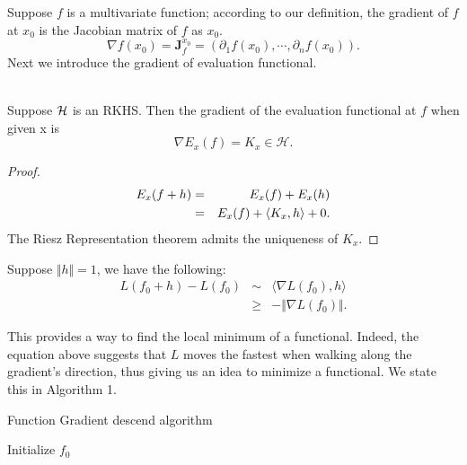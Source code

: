 %	
Suppose $f$ is a multivariate function; according to our definition, the gradient of 
$f$ at $x_0$ is the Jacobian matrix of $f$ as $x_0$.
$$
\nabla f(x_0) = \mathbf{J}_f^{x_0}=(\partial_1 f(x_0), \cdots, \partial_n f(x_0)) .
$$
Next we introduce the gradient of evaluation functional.
\begin{Theorem} \label{EVAL}\ \\ 
Suppose $\mathcal{H}$ is an RKHS. Then the gradient of the evaluation functional at $f$ when given x is 
$$
\nabla E_x (f) = K_x \in \mathcal{H}.
$$
\end{Theorem}
\begin{proof}

\begin{eqnarray*}
E_x(f + h) &=& E_x(f) + E_x(h) \\
&=& E_x(f) + {\langle K_x,h\rangle} + 0. \\ 
\end{eqnarray*}
The Riesz Representation theorem admits the uniqueness of $K_x$.
\end{proof}
Suppose $\Vert h \Vert =1$, we have the following:
\begin{eqnarray*}
L(f_0+h) - L(f_0) &\sim& \langle \nabla L (f_0), h \rangle \\
& \geq & -\Vert \nabla L (f_0) \Vert.
\end{eqnarray*}

This provides a  way to find the local minimum of a functional. Indeed, 
the equation above suggests that $L$ moves the fastest when walking along the gradient's direction, thus giving us an idea to minimize a functional. We state this in Algorithm 1.

\begin{center}
\begin{minipage}{0.95\linewidth}
\begin{algorithm}[H]
\SetAlgoLined
\caption{Function Gradient descend algorithm}
\KwIn{\begin{itemize}
	\item the functinal $L: V \to \R$.
	\item number of iterations $M \geq 1$
	\item leanring rate $\eta \in (0,1]$
\end{itemize}
}
Initialize $f_0$ \\
\end{algorithm}
\end{minipage}
\end{center}

